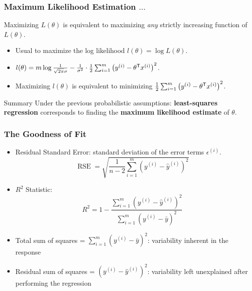 \documentclass[xcolor=table]{beamer}
\newcommand{\trans}[1]{\ensuremath{#1}^{\scriptsize{\textsf{T}}}}
\DeclareMathOperator{\RSE}{RSE}
\begin{document}
\begin{frame}[t]
\frametitle{Maximum Likelihood Estimation $\ldots$}
Maximizing $L(\theta)$ is equivalent to maximizing \emph{any} strictly increasing 
function of $L(\theta)$.

\pause

\begin{itemize}
    \item Usual to maximize the log likelihood $l(\theta) = \log L(\theta)$.

    \item $l(\theta) = m \log \frac{1}{\sqrt{2 \pi} \sigma} - 
                        \frac{1}{\sigma^2} \cdot \frac{1}{2} 
                            \sum_{i = 1}^{m}{\left ( y^{(i)} - \trans{\theta} x^{(i)} \right ) ^2}$.
    \item Maximizing $l(\theta)$ is equivalent to minimizing 
        $\frac{1}{2} \sum_{i = 1}^{m}{\left ( y^{(i)} - \trans{\theta} x^{(i)} \right ) ^2}$.
\end{itemize} 

\pause

\bigskip

\begin{block}{Summary}
Under the previous probabilistic assumptions: \textbf{least-squares regression} 
corresponds to finding the \textbf{maximum likelihood estimate} of $\theta$.
\end{block}
\end{frame}

\begin{frame}[t]
\frametitle{The Goodness of Fit}
\begin{itemize}
    \item Residual Standard Error: standard deviation of the error terms $\epsilon^{(i)}$.
    \[
        \RSE = \sqrt{\frac{1}{n - 2} \sum_{i = 1}^{m} \left ( y^{(i)} - \hat{y}^{(i)} \right )^2}
    \]

    \pause

    \item $R^2$ Statistic: 
    \[
        R^2 = 1 - \frac{ \sum_{i = 1}^{m} \left ( y^{(i)} - \hat{y}^{(i)} \right )^2}{ \sum_{i = 1}^{m} \left ( y^{(i)} - \bar{y} \right )^2}
    \]
\end{itemize}

\pause

\begin{itemize}
    \item Total sum of squares = $\sum_{i = 1}^{m} \left ( y^{(i)} - \bar{y} \right )^2$: variability 
        inherent in the response  
    
    \item Residual sum of squares = $\left ( y^{(i)} - \hat{y}^{(i)} \right )^2$: variability left 
        unexplained after performing the regression  
\end{itemize}
\end{frame}
\end{document}
